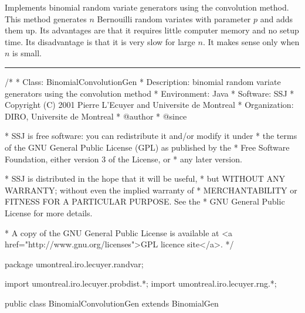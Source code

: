 
Implements binomial random variate generators using the 
convolution method.  
This method generates $n$ Bernouilli random variates with 
parameter $p$ and adds them up. 
Its advantages are that it requires
little computer memory and no setup time.
Its disadvantage is that it is very slow for large $n$.
It makes sense only when $n$ is small.


\bigskip\hrule

\begin{code}
\begin{hide}
/*
 * Class:        BinomialConvolutionGen
 * Description:  binomial random variate generators using the convolution method
 * Environment:  Java
 * Software:     SSJ 
 * Copyright (C) 2001  Pierre L'Ecuyer and Universite de Montreal
 * Organization: DIRO, Universite de Montreal
 * @author       
 * @since

 * SSJ is free software: you can redistribute it and/or modify it under
 * the terms of the GNU General Public License (GPL) as published by the
 * Free Software Foundation, either version 3 of the License, or
 * any later version.

 * SSJ is distributed in the hope that it will be useful,
 * but WITHOUT ANY WARRANTY; without even the implied warranty of
 * MERCHANTABILITY or FITNESS FOR A PARTICULAR PURPOSE.  See the
 * GNU General Public License for more details.

 * A copy of the GNU General Public License is available at
   <a href="http://www.gnu.org/licenses">GPL licence site</a>.
 */
\end{hide}
package umontreal.iro.lecuyer.randvar;\begin{hide}
import umontreal.iro.lecuyer.probdist.*;
import umontreal.iro.lecuyer.rng.*;\end{hide}

public class BinomialConvolutionGen extends BinomialGen \begin{hide} {
  
\end{hide}\end{code}

